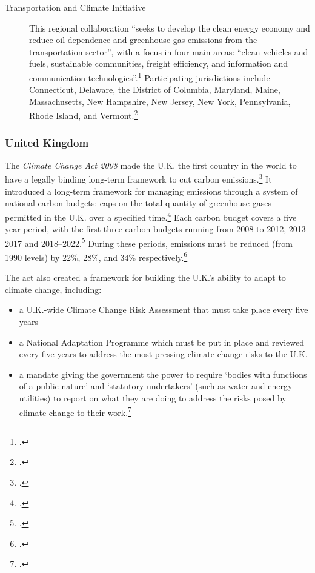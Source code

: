 \begin{description}
	\item[Transportation and Climate Initiative] This regional collaboration ``seeks to develop the clean energy economy and reduce oil dependence and greenhouse gas emissions from the transportation sector'', with a focus in four main areas: ``clean vehicles and fuels, sustainable communities, freight efficiency, and information and communication technologies''.\footcite[][]{TranspoClimate} Participating jurisdictions include Connecticut, Delaware, the District of Columbia, Maryland, Maine, Massachusetts, New Hampshire, New Jersey, New York, Pennsylvania, Rhode Island, and Vermont.\footcite[][]{GeorgetownOnTC}
\end{description}



	\subsubsection{United Kingdom}



The \emph{Climate Change Act 2008} made the U.K. the first country in the world to have a legally binding long-term framework to cut carbon emissions.\footcite[][]{ClimateConvention2009}
It introduced a long-term framework for managing emissions through a system of national carbon budgets: caps on the total quantity of greenhouse gases permitted in the U.K. over a specified time.\footcite[][]{ClimateConvention2009}
Each carbon budget covers a five year period, with the first three carbon budgets running from 2008 to 2012, 2013--2017 and 2018--2022.\footcite[][]{ClimateConvention2009}
During these periods, emissions must be reduced (from 1990 levels) by 22\%, 28\%, and 34\% respectively.\footcite[][]{ClimateConvention2009}



The act also created a framework for building the U.K.'s ability to adapt to climate change, including:
\begin{itemize}
	\item a U.K.-wide Climate Change Risk Assessment that must take place every five years
	\item a National Adaptation Programme which must be put in place and reviewed every five years to address the most pressing climate change risks to the U.K.
	\item a mandate giving the government the power to require `bodies with functions of a public nature' and `statutory undertakers' (such as water and energy utilities) to report on what they are doing to address the risks posed by climate change to their work.\footcite[][]{ClimateConvention2009}
\end{itemize}


